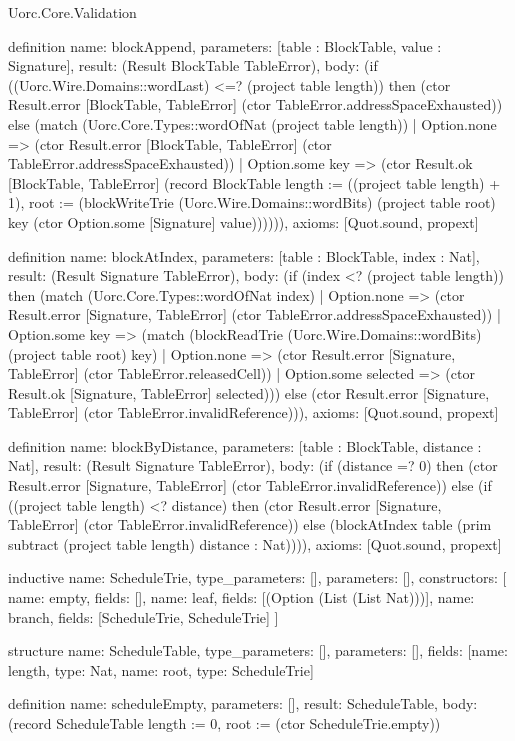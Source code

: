 \begin{lexlean}{Uorc.Core.Validation}
\begin{semanticmodule}
definition{
  name: blockAppend,
  parameters: [table : BlockTable, value : Signature],
  result: (Result BlockTable TableError),
  body: (if ((Uorc.Wire.Domains::wordLast) <=? (project table length)) then (ctor Result.error [BlockTable, TableError] (ctor TableError.addressSpaceExhausted)) else (match (Uorc.Core.Types::wordOfNat (project table length))
    | Option.none => (ctor Result.error [BlockTable, TableError] (ctor TableError.addressSpaceExhausted))
    | Option.some key => (ctor Result.ok [BlockTable, TableError] (record BlockTable {length := ((project table length) + 1), root := (blockWriteTrie (Uorc.Wire.Domains::wordBits) (project table root) key (ctor Option.some [Signature] value))})))),
  axioms: [Quot.sound, propext]
}

definition{
  name: blockAtIndex,
  parameters: [table : BlockTable, index : Nat],
  result: (Result Signature TableError),
  body: (if (index <? (project table length)) then (match (Uorc.Core.Types::wordOfNat index)
    | Option.none => (ctor Result.error [Signature, TableError] (ctor TableError.addressSpaceExhausted))
    | Option.some key => (match (blockReadTrie (Uorc.Wire.Domains::wordBits) (project table root) key)
      | Option.none => (ctor Result.error [Signature, TableError] (ctor TableError.releasedCell))
      | Option.some selected => (ctor Result.ok [Signature, TableError] selected))) else (ctor Result.error [Signature, TableError] (ctor TableError.invalidReference))),
  axioms: [Quot.sound, propext]
}

definition{
  name: blockByDistance,
  parameters: [table : BlockTable, distance : Nat],
  result: (Result Signature TableError),
  body: (if (distance =? 0) then (ctor Result.error [Signature, TableError] (ctor TableError.invalidReference)) else (if ((project table length) <? distance) then (ctor Result.error [Signature, TableError] (ctor TableError.invalidReference)) else (blockAtIndex table (prim subtract (project table length) distance : Nat)))),
  axioms: [Quot.sound, propext]
}

inductive{
  name: ScheduleTrie,
  type_parameters: [],
  parameters: [],
  constructors: [
    {name: empty, fields: []},
    {name: leaf, fields: [(Option (List (List Nat)))]},
    {name: branch, fields: [ScheduleTrie, ScheduleTrie]}
  ]
}

structure{
  name: ScheduleTable,
  type_parameters: [],
  parameters: [],
  fields: [{name: length, type: Nat}, {name: root, type: ScheduleTrie}]
}

definition{
  name: scheduleEmpty,
  parameters: [],
  result: ScheduleTable,
  body: (record ScheduleTable {length := 0, root := (ctor ScheduleTrie.empty)})
}


\end{semanticmodule}
\end{lexlean}

